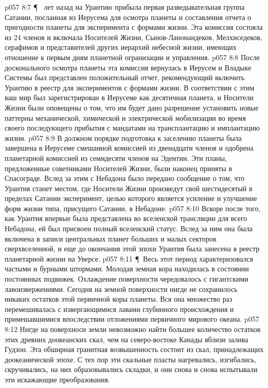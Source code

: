 \vs p057 8:7 \P\  лет назад на Урантию прибыла первая разведывательная группа Сатании, посланная из Иерусема для осмотра планеты и составления отчета о пригодности планеты для эксперимента с формами жизни. Эта комиссия состояла из 24 членов и включала Носителей Жизни, Сынов\hyp{}Ланонандеков, Мелхиседеков, серафимов и представителей других иерархий небесной жизни, имеющих отношение к первым дням планетной огранизации и управления.
\vs p057 8:8 После досконального осмотра планеты эта комиссия вернулась в Иерусем и Владыке Системы был представлен положительный отчет, рекомендующий включить Урантию в реестр для экспериментов с формами жизни. В соответствии с этим ваш мир был зарегистрирован в Иерусеме как десятичная планета, и Носители Жизни были оповещены о том, что им будет дано разрешение установить новые паттерны механической, химической и электрической мобилизации во время своего последующего прибытия с мандатами на трансплантацию и имплантацию жизни.
\vs p057 8:9 В должном порядке подготовка к заселению планеты была завершена в Иерусеме смешанной комиссией из двенадцати членов и одобрена планетарной комиссией из семидесяти членов на Эдентии. Эти планы, предложенные советниками Носителей Жизни, были наконец приняты в Спасограде. Вслед за этим с Небадона было передано сообщение о том, что Урантия станет местом, где Носители Жизни произведут свой шестидесятый в пределах Сатании эксперимент, целью которого является усиление и улучшение форм жизни типа, присущего Сатании, в Небадоне.
\vs p057 8:10 Вскоре после того, как Урантия впервые была представлена во вселенской трансляции для всего Небадона, ей был присвоен полный вселенский статус. Вслед за ним она была включена в записи центральных планет больших и малых секторов сверхвселенной, и еще до окончания этой эпохи Урантия была занесена в реестр планетарной жизни на Уверсе.
\vs p057 8:11 \P\ Весь этот период характеризовался частыми и бурными штормами. Молодая земная кора находилась в состоянии постоянных подвижек. Охлаждение поверхности чередовалось с гигантскими лавоизвержениями. Сегодня на земной поверхности нигде не сохранилось никаких остатков этой первичной коры планеты. Вся она множество раз перемешивалась с извергающимися лавами глубинного происхождения и примешавшимися впоследствии отложениями первичного мирового океана.
\vs p057 8:12 Нигде на поверхноси земли невозможно найти большее количество остатков этих древних доокеанских скал, чем на северо\hyp{}востоке Канады вблизи залива Гудзон. Эта обширная гранитная возвышенность состоит из скал, принадлежащих доокеанической эпохе. С тех пор эти скальные пласты нагревались, изгибались, скручивались, на них образовывались складки, и они снова и снова испытывали эти искажающие преобразования.
